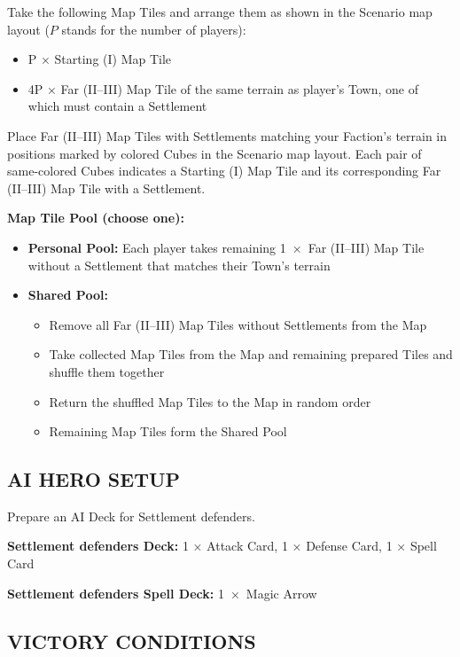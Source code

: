 \begin{multicols}{2}
Take the following Map Tiles and arrange them as shown in the Scenario map layout ($P$ stands for the number of players):

\begin{itemize}
  \item P × Starting (I) Map Tile
  \item 4P × Far (II--III) Map Tile of the same terrain as player's Town, one of which must contain a Settlement
\end{itemize}

Place Far (II--III) Map Tiles with Settlements matching your Faction's terrain in positions marked by colored Cubes in the Scenario map layout.
Each pair of same-colored Cubes indicates a Starting (I) Map Tile and its corresponding Far (II--III) Map Tile with a Settlement.

\textbf{Map Tile Pool (choose one):}

\begin{itemize}
  \item \textbf{Personal Pool:} Each player takes remaining 1~×~Far (II--III) Map Tile without a Settlement that matches their Town's terrain
  \item \textbf{Shared Pool:}
  \begin{itemize}
    \item Remove all Far (II--III) Map Tiles without Settlements from the Map
    \item Take collected Map Tiles from the Map and remaining prepared Tiles and shuffle them together
    \item Return the shuffled Map Tiles to the Map in random order
    \item Remaining Map Tiles form the Shared Pool
  \end{itemize}
\end{itemize}

\subsection*{\MakeUppercase{AI Hero Setup}}

Prepare an AI Deck for Settlement defenders.

\textbf{Settlement defenders Deck:} 1 × Attack Card, 1 × Defense Card, 1 × Spell Card

\textbf{Settlement defenders Spell Deck:} 1~×~Magic Arrow

\subsection*{\MakeUppercase{Victory Conditions}}


\end{multicols}
